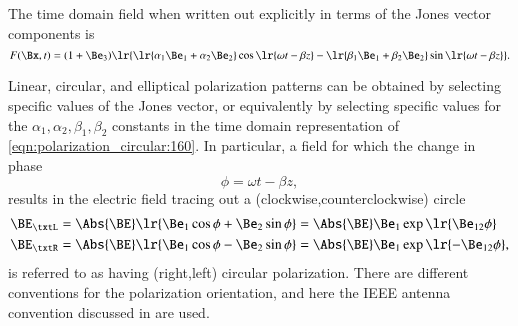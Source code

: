 %
%


The time domain field when written out explicitly in terms of the Jones vector components is
\begin{dmath}\label{eqn:polarization_circular:160}
F(\Bx, t) = (1 + \Be_3) \lr{
\lr{ \alpha_1 \Be_1 + \alpha_2 \Be_2 } \cos\lr{ \omega t - \beta z }
-\lr{ \beta_1 \Be_1 + \beta_2 \Be_2 } \sin\lr{ \omega t - \beta z }
}.
\end{dmath}

Linear, circular, and elliptical polarization patterns can be obtained by selecting specific values of the Jones vector, or equivalently by selecting specific values for the \( \alpha_1, \alpha_2, \beta_1, \beta_2 \) constants in the time domain representation of \cref{eqn:polarization_circular:160}.
In particular,
a field for which the
change in phase
\begin{dmath}\label{eqn:polarization_circular:520}
\phi = \omega t - \beta z,
\end{dmath}
results in the electric field tracing out a (clockwise,counterclockwise) circle
\begin{dmath}\label{eqn:polarization_circular:180}
\begin{aligned}
\BE_\txtL &= \Abs{\BE} \lr{ \Be_1 \cos\phi + \Be_2 \sin\phi } = \Abs{\BE} \Be_1 \exp\lr{  \Be_{12} \phi } \\
\BE_\txtR &= \Abs{\BE} \lr{ \Be_1 \cos\phi - \Be_2 \sin\phi } = \Abs{\BE} \Be_1 \exp\lr{ -\Be_{12} \phi },
\end{aligned}
\end{dmath}
is referred to as having
(right,left) circular polarization.
There are different conventions for the polarization orientation, and here the IEEE antenna convention discussed in \citep{balanis1989advanced} are used.


